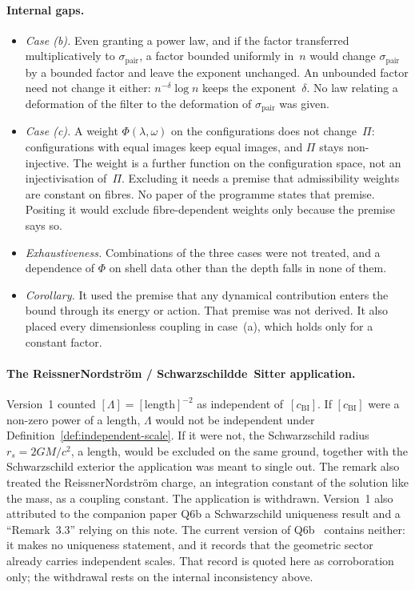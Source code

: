 \documentclass[11pt,a4paper]{article}
\begin{document}
    \paragraph{Internal gaps.}
    \begin{itemize}
      \item \emph{Case (b).}
        Even granting a power law, and if the factor transferred multiplicatively to $\sigma_{\mathrm{pair}}$, a
        factor bounded uniformly in~$n$ would change $\sigma_{\mathrm{pair}}$ by a bounded factor and leave the
        exponent unchanged.
        An unbounded factor need not change it either: $n^{-\delta}\log n$ keeps the exponent~$\delta$.
        No law relating a deformation of the filter to the deformation of $\sigma_{\mathrm{pair}}$ was given.
      \item \emph{Case (c).}
        A weight $\Phi(\lambda,\omega)$ on the configurations does not change~$\Pi$: configurations with equal
        images keep equal images, and $\Pi$ stays non-injective.
        The weight is a further function on the configuration space, not an injectivisation of~$\Pi$.
        Excluding it needs a premise that admissibility weights are constant on fibres.
        No paper of the programme states that premise.
        Positing it would exclude fibre-dependent weights only because the premise says so.
      \item \emph{Exhaustiveness.}
        Combinations of the three cases were not treated, and a dependence of $\Phi$ on shell data other than
        the depth falls in none of them.
      \item \emph{Corollary.}
        It used the premise that any dynamical contribution enters the bound through its energy or action.
        That premise was not derived.
        It also placed every dimensionless coupling in case~(a), which holds only for a constant factor.
    \end{itemize}

    \paragraph{The Reissner\textendash Nordstr\"om / Schwarzschild\textendash de~Sitter application.}
    Version~1 counted $[\Lambda]=[\mathrm{length}]^{-2}$ as independent of~$[c_{\mathrm{BI}}]$.
    If $[c_{\mathrm{BI}}]$ were a non-zero power of a length, $\Lambda$ would not be independent under
    Definition~\ref{def:independent-scale}.
    If it were not, the Schwarzschild radius $r_s=2GM/c^2$, a length, would be excluded on the same ground, together
    with the Schwarzschild exterior the application was meant to single out.
    The remark also treated the Reissner\textendash Nordstr\"om charge, an integration constant of the solution
    like the mass, as a coupling constant.
    The application is withdrawn.
    Version~1 also attributed to the companion paper Q6b a Schwarzschild uniqueness result and a ``Remark~3.3''
    relying on this note.
    The current version of Q6b~\cite{Beau2026q6b} contains neither: it makes no uniqueness statement, and it
    records that the geometric sector already carries independent scales.
    That record is quoted here as corroboration only; the withdrawal rests on the internal inconsistency above.
\end{document}
